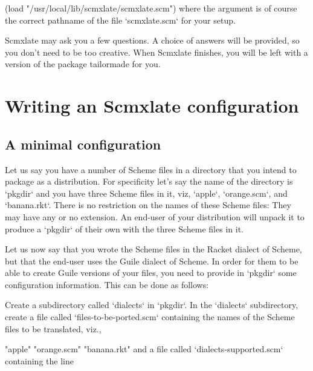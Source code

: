 \begintts
(load "/usr/local/lib/scmxlate/scmxlate.scm")
\endtt
where the  argument is of course the correct
pathname of the file `scmxlate.scm` for your
setup.

Scmxlate may ask you a few questions.  A
choice of answers will be provided, so you don’t need
to be too creative.  When Scmxlate finishes, you
will be left with a version of the package tailormade
for you.

\section{Writing an Scmxlate configuration}
\label{writeconfig}

%

\subsection{A minimal configuration}

Let us say you have a number of Scheme files in
a directory that you intend to package as a
distribution.  For specificity let’s say the name of the
directory is `pkgdir` and you have three Scheme files in it,
viz, `apple`, `orange.scm`, and `banana.rkt`.
There is no restriction on the names of these Scheme
files: They may have any or no extension.  An end-user
of your distribution will unpack it to produce a
`pkgdir` of their own with the three Scheme files in
it.

Let us now say that you wrote the Scheme files in the
Racket dialect of Scheme, but that the end-user
uses the Guile dialect of Scheme.  In order for them to
be able to create Guile versions of your files, you
need to provide in `pkgdir` some configuration
information.  This can be done as follows:

Create a subdirectory called `dialects` in
`pkgdir`.  In the `dialects` subdirectory,
create a file called `files-to-be-ported.scm`
containing the names of the Scheme files to be
translated,  viz.,

\begintts
"apple"
"orange.scm"
"banana.rkt"
\endtt
and a file called `dialects-supported.scm` containing
the line

